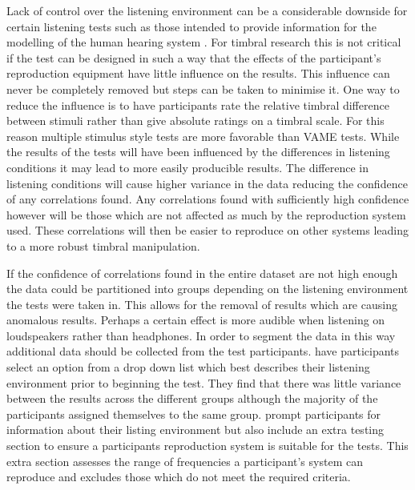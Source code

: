 			Lack of control over the listening environment can be a considerable downside for certain listening
			tests such as those intended to provide information for the modelling of the human hearing system
			\citep{moore1990auditory}. For timbral research this is not critical if the test can be designed in
			such a way that the effects of the participant's reproduction equipment have little influence on
			the results. This influence can never be completely removed but steps can be taken to minimise it.
			One way to reduce the influence is to have participants rate the relative timbral difference
			between stimuli rather than give absolute ratings on a timbral scale. For this reason multiple
			stimulus style tests are more favorable than VAME tests. While the results of the tests will have
			been influenced by the differences in listening conditions it may lead to more easily producible
			results. The difference in listening conditions will cause higher variance in the data reducing the
			confidence of any correlations found. Any correlations found with sufficiently high confidence
			however will be those which are not affected as much by the reproduction system used. These
			correlations will then be easier to reproduce on other systems leading to a more robust timbral
			manipulation.

			If the confidence of correlations found in the entire dataset are not high enough the data could be
			partitioned into groups depending on the listening environment the tests were taken in. This allows
			for the removal of results which are causing anomalous results. Perhaps a certain effect is more
			audible when listening on loudspeakers rather than headphones. In order to segment the data in this
			way additional data should be collected from the test participants. \citet{wilmering2013audio} have
			participants select an option from a drop down list which best describes their listening
			environment prior to beginning the test. They find that there was little variance between the
			results across the different groups although the majority of the participants assigned themselves
			to the same group. \citet{seetharaman2014crowdsourcing} prompt participants for information about
			their listing environment but also include an extra testing section to ensure a participants
			reproduction system is suitable for the tests. This extra section assesses the range of frequencies
			a participant's system can reproduce and excludes those which do not meet the required criteria.
			
